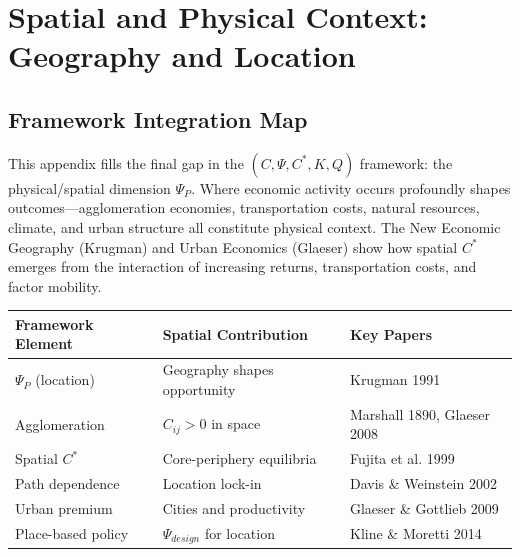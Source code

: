 \section{Spatial and Physical Context: Geography and Location}
\label{app:spatial-context}

\subsection{Framework Integration Map}

This appendix fills the final gap in the $(C, \Psi, C^*, K, Q)$ framework: 
the physical/spatial dimension $\Psi_P$. Where economic activity occurs 
profoundly shapes outcomes---agglomeration economies, transportation costs, 
natural resources, climate, and urban structure all constitute physical 
context. The New Economic Geography (Krugman) and Urban Economics (Glaeser) 
show how spatial $C^*$ emerges from the interaction of increasing returns, 
transportation costs, and factor mobility.

\begin{center}
\renewcommand{\arraystretch}{1.4}
\begin{tabular}{|l|l|l|}
\hline
\textbf{Framework Element} & \textbf{Spatial Contribution} & \textbf{Key Papers} \\
\hline
$\Psi_P$ (location) & Geography shapes opportunity & Krugman 1991 \\
Agglomeration & $C_{ij} > 0$ in space & Marshall 1890, Glaeser 2008 \\
Spatial $C^*$ & Core-periphery equilibria & Fujita et al. 1999 \\
Path dependence & Location lock-in & Davis \& Weinstein 2002 \\
Urban premium & Cities and productivity & Glaeser \& Gottlieb 2009 \\
Place-based policy & $\Psi_{design}$ for location & Kline \& Moretti 2014 \\
\hline
\end{tabular}
\end{center}

